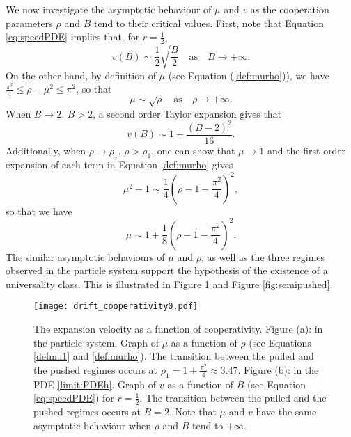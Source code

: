 \documentclass[11pt]{article}
\theoremstyle{plain}
\begin{document}
We now investigate the asymptotic behaviour of $\mu$ and $v$ as the cooperation parameters $\rho$ and $B$ tend to their critical values. First, note that Equation \eqref{eq:speedPDE} implies that, for $r=\frac{1}{2}$,
\begin{equation*}
v(B)\sim \frac{1}{2}\sqrt{\frac{B}{2}}\quad \text{as} \quad  B\to+\infty.
\end{equation*}
On the other hand, by definition of $\mu$ (see Equation (\ref{def:murho})), we have $\frac{\pi^2}{4}\leqslant \rho-\mu^2\leqslant \pi^2$, so that 
\begin{equation*}
\mu\sim \sqrt{\rho}\quad \text{as} \quad\rho \to +\infty.
\end{equation*}
When $B\to 2$, $B>2$, a second order Taylor expansion gives that
\begin{equation*}
v(B)\sim 1+\frac{(B-2)^2}{16}.
\end{equation*}
Additionally, when $\rho\to\rho_1$, $\rho>\rho_1$, one can show that $\mu\to 1$ and the first order expansion of each term in Equation \eqref{def:murho} gives 
\begin{equation*}
\mu^2-1\sim\frac{1}{4}\left(\rho-1-\frac{\pi^2}{4}\right)^2,
\end{equation*}
so that we have 
\begin{equation*}
\mu\sim1+\frac{1}{8}\left(\rho-1-\frac{\pi^2}{4}\right)^2.
\end{equation*}
The similar asymptotic behaviours of $\mu$ and $\rho$, as well as the three regimes observed in the particle system support the hypothesis of the existence of a universality class. This is illustrated in Figure \ref{fig:driftv} and Figure \ref{fig:semipushed}.
\begin{figure}[h]
\begin{center}
\captionsetup{width=.9\linewidth}
 \texttt{[image: drift\_cooperativity0.pdf]}\\
\caption[]{The expansion velocity as a function of cooperativity. Figure (a): in the particle system. Graph of $\mu$ as a function of $\rho$ (see Equations \eqref{defmu1} and \eqref{def:murho}).  The transition between the pulled and the pushed regimes occurs at $\rho_1=1+\frac{\pi^2}{4}\approx 3.47$.  Figure (b): in the PDE \eqref{limit:PDEh}. Graph of $v$ as a function of $B$ (see Equation \eqref{eq:speedPDE}) for $r=\frac{1}{2}$. The transition between the pulled and the pushed regimes occurs at $B=2$. Note that $\mu$ and $v$ have the same asymptotic behaviour when $\rho$ and $B$ tend to $+\infty$.} 
\label{fig:driftv}
\end{center}
\end{figure}
\end{document}
